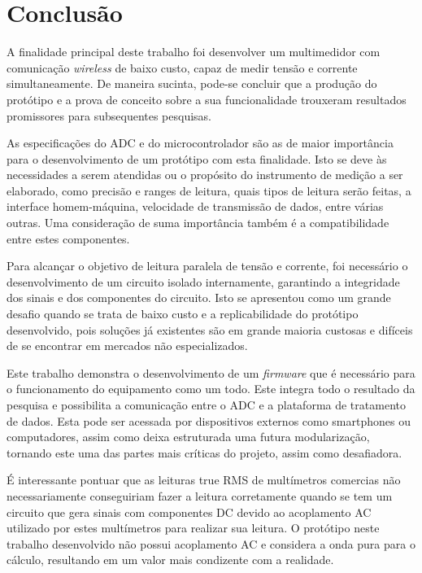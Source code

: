 \chapter{Conclusão}\label{cap:conclusoeseperspectivas}

A finalidade principal deste trabalho foi desenvolver um multimedidor com comunicação \textit{wireless} de baixo custo, capaz de medir tensão e corrente simultaneamente. De maneira sucinta, pode-se concluir que a produção do protótipo e a prova de conceito sobre a sua funcionalidade trouxeram resultados promissores para subsequentes pesquisas.

As especificações do \gls{ADC} e do microcontrolador são as de maior importância para o desenvolvimento de um protótipo com esta finalidade. Isto se deve às necessidades a serem atendidas ou o propósito do instrumento de medição a ser elaborado, como precisão e ranges de leitura, quais tipos de leitura serão feitas, a interface homem-máquina, velocidade de transmissão de dados, entre várias outras. Uma consideração de suma importância também é a compatibilidade entre estes componentes.

Para alcançar o objetivo de leitura paralela de tensão e corrente, foi necessário o desenvolvimento de um circuito isolado internamente, garantindo a integridade dos sinais e dos componentes do circuito. Isto se apresentou como um grande desafio quando se trata de baixo custo e a replicabilidade do protótipo desenvolvido, pois soluções já existentes são em grande maioria custosas e difíceis de se encontrar em mercados não especializados.

Este trabalho demonstra o desenvolvimento de um \textit{firmware} que é necessário para o funcionamento do equipamento como um todo. Este integra todo o resultado da pesquisa e possibilita a comunicação entre o ADC e a plataforma de tratamento de dados. Esta pode ser acessada por dispositivos externos como smartphones ou computadores, assim como deixa estruturada uma futura modularização, tornando este uma das partes mais críticas do projeto, assim como desafiadora.

É interessante pontuar que as leituras true RMS de multímetros comercias não necessariamente conseguiriam fazer a leitura corretamente quando se tem um circuito que gera sinais com componentes DC devido ao acoplamento AC utilizado por estes multímetros para realizar sua leitura. O protótipo neste trabalho desenvolvido não possui acoplamento AC e considera a onda pura para o cálculo, resultando em um valor mais condizente com a realidade.

